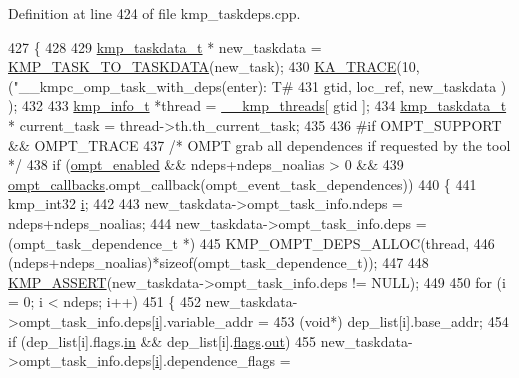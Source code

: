 Definition at line 424 of file kmp\-\_\-taskdeps.\-cpp.


\begin{DoxyCode}
427 \{
428 
429     \hyperlink{structkmp__taskdata}{kmp\_taskdata\_t} * new\_taskdata = \hyperlink{kmp_8h_a7996bdfd391438365a93a3c7fba1c440}{KMP\_TASK\_TO\_TASKDATA}(new\_task);
430     \hyperlink{kmp__debug_8h_a21d51f37cb197aca5ffe737531678830}{KA\_TRACE}(10, (\textcolor{stringliteral}{"\_\_kmpc\_omp\_task\_with\_deps(enter): T#%
431                   gtid, loc\_ref, new\_taskdata ) );
432 
433     \hyperlink{kmp_8h_a194859801fe16b326efe34501a37c30a}{kmp\_info\_t} *thread = \hyperlink{kmp_8h_a8ba907eb5a2568ff55a49a1504cd3624}{\_\_kmp\_threads}[ gtid ];
434     \hyperlink{structkmp__taskdata}{kmp\_taskdata\_t} * current\_task = thread->th.th\_current\_task;
435 
436 \textcolor{preprocessor}{#if OMPT\_SUPPORT && OMPT\_TRACE}
437 \textcolor{preprocessor}{}    \textcolor{comment}{/* OMPT grab all dependences if requested by the tool */}
438     \textcolor{keywordflow}{if} (\hyperlink{ompt-general_8c_a966b31b6d05f79f5495f8d8e71732f68}{ompt\_enabled} && ndeps+ndeps\_noalias > 0 &&
439         \hyperlink{ompt-general_8c_a84a29d89cef82c7c38e1ee1f70ec994f}{ompt\_callbacks}.ompt\_callback(ompt\_event\_task\_dependences))
440         \{
441         kmp\_int32 \hyperlink{kmp__stub_8c_a08582ce460e3d5e1cf0b7fea017d608e}{i};
442 
443         new\_taskdata->ompt\_task\_info.ndeps = ndeps+ndeps\_noalias;
444         new\_taskdata->ompt\_task\_info.deps = (ompt\_task\_dependence\_t *)
445           KMP\_OMPT\_DEPS\_ALLOC(thread,
446              (ndeps+ndeps\_noalias)*\textcolor{keyword}{sizeof}(ompt\_task\_dependence\_t));
447 
448         \hyperlink{kmp__debug_8h_a5323a368e8ba273b17c46906dd9ec78c}{KMP\_ASSERT}(new\_taskdata->ompt\_task\_info.deps != NULL);
449 
450         \textcolor{keywordflow}{for} (i = 0; i < ndeps; i++)
451         \{
452             new\_taskdata->ompt\_task\_info.deps[\hyperlink{kmp__stub_8c_a08582ce460e3d5e1cf0b7fea017d608e}{i}].variable\_addr =
453               (\textcolor{keywordtype}{void}*) dep\_list[i].base\_addr;
454             \textcolor{keywordflow}{if} (dep\_list[i].flags.\hyperlink{structkmp__depend__info_a65b239cf11dd7d59dc86eb9ab5f6e414}{in} && dep\_list[i].\hyperlink{structkmp__depend__info_aa36eee45c425e2a66beb059660c9fb63}{flags}.\hyperlink{structkmp__depend__info_ad2f4d34c0d6aa127073c9e21a5041244}{out})
455                 new\_taskdata->ompt\_task\_info.deps[\hyperlink{kmp__stub_8c_a08582ce460e3d5e1cf0b7fea017d608e}{i}].dependence\_flags =
}
\end{DoxyCode}
